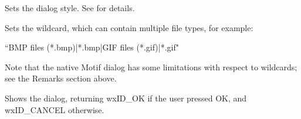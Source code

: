 
Sets the dialog style. See  for details.

\label{wxfiledialogsetwildcard}


Sets the wildcard, which can contain multiple file types, for example:

``BMP files (*.bmp)|*.bmp|GIF files (*.gif)|*.gif"

Note that the native Motif dialog has some limitations with respect to
wildcards; see the Remarks section above.

\label{wxfiledialogshowmodal}


Shows the dialog, returning wxID\_OK if the user pressed OK, and wxID\_CANCEL
otherwise.


